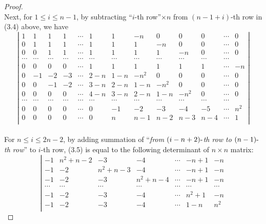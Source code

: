 \documentclass{article}
\begin{document}
\begin{proof}
\\
Next, for $1\leq i \leq n-1$, by subtracting ``$i$-th row''$\times n$ from $(n-1+i)$-th row in (3.4) above, we have
\begin{equation}
\left|
\begin{array}{ccccccccccccc}
1 & 1 & 1 & 1 & \cdots & 1 & 1 & -n & 0 & 0 & 0 & \cdots & 0 \\
0 & 1 & 1 & 1 & \cdots & 1 & 1 & 1 & -n & 0 & 0 & \cdots & 0 \\
0 & 0 & 1 & 1 & \cdots & 1 & 1 & 1 & 1 & -n & 0 & \cdots & 0 \\
\cdots & \cdots & \cdots & \cdots & \cdots & \cdots & \cdots & \cdots & \cdots & \cdots & \cdots & \cdots \\
0 & 0 & 0 & 0 & \cdots & 1 & 1 & 1 & 1 & 1 & 1 & \cdots & -n \\
0 & -1 & -2 & -3 & \cdots & 2-n & 1-n & -n^{2} & 0 & 0 & 0 & \cdots & 0 \\
0 & 0 & -1 & -2 & \cdots & 3-n & 2-n & 1-n & -n^{2} & 0 & 0 & \cdots & 0 \\
0 & 0 & 0 & 0 & \cdots & 4-n & 3-n & 2-n & 1-n & -n^{2} & 0 & \cdots & 0 \\
\cdots & \cdots & \cdots & \cdots & \cdots & \cdots & \cdots & \cdots & \cdots & \cdots & \cdots & \cdots \\
0 & 0 & 0 & 0 & \cdots & 0 & -1 & -2 & -3 & -4 & -5 & \cdots & n^{2} \\
0 & 0 & 0 & 0 & \cdots & 0 & n & n-1 & n-2 & n-3 & n-4 & \cdots & 1 \\
\end{array}
\right|
\end{equation}
\\
For $n\leq i \leq 2n-2$, by adding summation of ``{\it from $(i-n+2)\mathchar`-$th row to $(n-1)\mathchar`-$th row}'' to $i$-th row, (3.5) is equal to the following determinant of $n\times n$ matrix:
\begin{equation}
\left|
\begin{array}{ccccccc}
-1 & n^{2}+n-2 & -3 & -4 & \cdots & -n+1 & -n \\
-1 & -2 & n^{2}+n-3 & -4 & \cdots & -n+1 & -n \\
-1 & -2 & -3 &  n^{2}+n-4 & \cdots & -n+1 & -n \\
\cdots & \cdots & \cdots & \cdots & \cdots & \cdots & \cdots \\
-1 & -2 & -3 &  -4 & \cdots & n^{2}+1 & -n \\
-1 & -2 & -3 &  -4 & \cdots & 1-n & n^{2} \\

\end{array}
\end{equation}
\end{proof}
\end{document}
